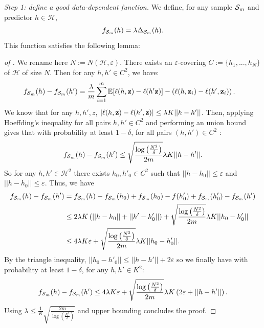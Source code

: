 \textit{Step 1: define a good data-dependent function.} We define, for any sample $\mathcal{S}_m$ and predictor $h\in \mathcal{H}$,
\[ f_{\mathcal{S}_m}(h) = \lambda \Delta_{\mathcal{S}_m}(h). \]
This function satisfies the following lemma:
\begin{proof}[of ]
We rename here $N:= N(\mathcal{H},\varepsilon)$. There exists an $\varepsilon$-covering $C:=\{h_1,...,h_N\}$ of $\mathcal{H}$ of size $N$.
Then for any $h,h'\in C^2$, we have:
\begin{align*}
f_{\mathcal{S}_m}(h)-f_{\mathcal{S}_m}(h')  & = \frac{\lambda}{m}\sum_{i=1}^m \mathbb{E}[\ell(h,\mathbf{z})-\ell(h'\mathbf{z})] - \left(\ell(h,\mathbf{z}_i)-\ell(h',\mathbf{z}_i)\right).
\end{align*}
We know that for any $h,h',z$, $|\ell(h,\mathbf{z})-\ell(h',\mathbf{z})| \leq \lambda K||h-h'||$. Then, applying Hoeffding's inequality for all pairs $h,h'\in C^2$ and performing an union bound gives that with probability at least $1-\delta$, for all pairs $(h,h')\in C^2$ :
\begin{align*}
f_{\mathcal{S}_m}(h)-f_{\mathcal{S}_m}(h')  \leq \sqrt{\frac{\log\left(\frac{N^2}{\delta}\right)}{2m}} \lambda K ||h-h'||.
\end{align*}
So for any $h,h'\in \mathcal{H}^2$ there exists $h_0,h'_0\in C^2$ such that $||h-h_0||\leq \varepsilon$ and $||h-h_0||\leq \varepsilon$. Thus, we have
\begin{align*}
f_{\mathcal{S}_m}(h)-f_{\mathcal{S}_m}(h')  & = f_{\mathcal{S}_m}(h)-f_{\mathcal{S}_m}(h_0) + f_{\mathcal{S}_m}(h_0)-f(h'_0)+ f_{\mathcal{S}_m}(h'_0)-f_{\mathcal{S}_m}(h') \\
& \leq 2\lambda K \left(||h-h_0|| + ||h'-h'_0||\right) + \sqrt{\frac{\log\left(\frac{N^2}{\delta}\right)}{2m}} \lambda K ||h_0-h_0'|| \\
& \leq 4\lambda K \varepsilon + \sqrt{\frac{\log\left(\frac{N^2}{\delta}\right)}{2m}} \lambda K ||h_0-h'_0||.
\end{align*}
By the triangle inequality, $||h_0-h'_0||\leq ||h-h'|| + 2\varepsilon$ so we finally have with probability at least $1-\delta$, for any $h,h'\in K^2$:
\[  f_{\mathcal{S}_m}(h)-f_{\mathcal{S}_m}(h') \leq 4\lambda K \varepsilon + \sqrt{\frac{\log\left(\frac{N^2}{\delta}\right)}{2m}} \lambda K \left( 2\varepsilon+ ||h-h'||\right).\]
Using $\lambda \leq \frac{1}{K}\sqrt{\frac{2m}{\log\left(\frac{N^2}{\delta}\right)}}$ and upper bounding concludes the proof.
\end{proof}

